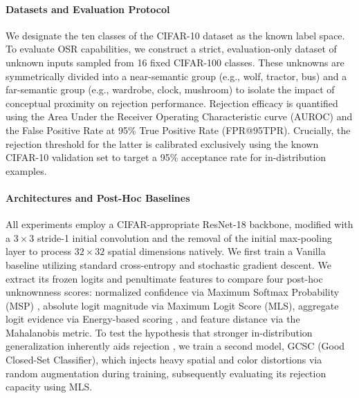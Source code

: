 \documentclass{article}
\begin{document}
\paragraph{Datasets and Evaluation Protocol}
We designate the ten classes of the CIFAR-10 dataset as the known label space. To evaluate OSR capabilities, we construct a strict, evaluation-only dataset of unknown inputs sampled from 16 fixed CIFAR-100 classes. These unknowns are symmetrically divided into a near-semantic group (e.g., wolf, tractor, bus) and a far-semantic group (e.g., wardrobe, clock, mushroom) to isolate the impact of conceptual proximity on rejection performance. Rejection efficacy is quantified using the Area Under the Receiver Operating Characteristic curve (AUROC) and the False Positive Rate at 95\% True Positive Rate (FPR@95TPR). Crucially, the rejection threshold for the latter is calibrated exclusively using the known CIFAR-10 validation set to target a 95\% acceptance rate for in-distribution examples.

\paragraph{Architectures and Post-Hoc Baselines}
All experiments employ a CIFAR-appropriate ResNet-18 backbone, modified with a $3 \times 3$ stride-1 initial convolution and the removal of the initial max-pooling layer to process $32 \times 32$ spatial dimensions natively. We first train a Vanilla baseline utilizing standard cross-entropy and stochastic gradient descent. We extract its frozen logits and penultimate features to compare four post-hoc unknownness scores: normalized confidence via Maximum Softmax Probability (MSP) \citep{hendrycks2017a}, absolute logit magnitude via Maximum Logit Score (MLS), aggregate logit evidence via Energy-based scoring \citep{NEURIPS2020_f5496252}, and feature distance via the Mahalanobis metric. To test the hypothesis that stronger in-distribution generalization inherently aids rejection \citep{vaze2022opensetrecognitiongoodclosedset}, we train a second model, GCSC (Good Closed-Set Classifier), which injects heavy spatial and color distortions via random augmentation during training, subsequently evaluating its rejection capacity using MLS.
\end{document}
